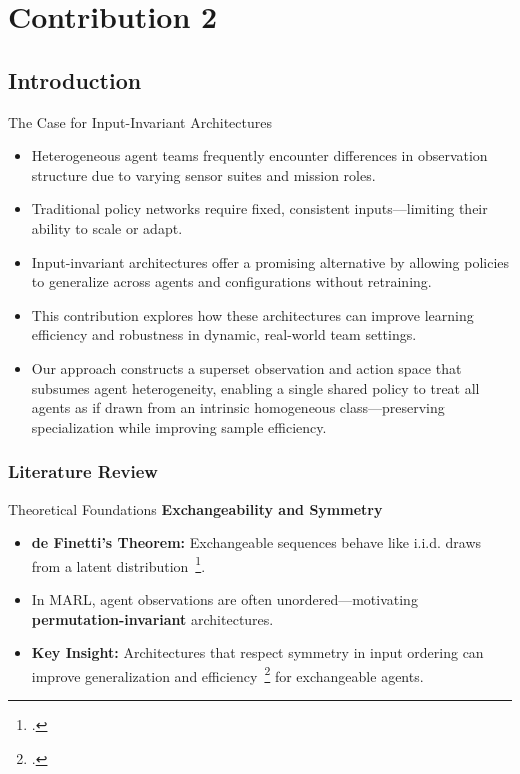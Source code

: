\section{Contribution 2}


\subsection{Introduction}

\begin{frame}{The Case for Input-Invariant Architectures}
    \begin{itemize}
        \item Heterogeneous agent teams frequently encounter differences in observation 
            structure due to varying sensor suites and mission roles.
        \item Traditional policy networks require fixed, consistent inputs—limiting their 
            ability to scale or adapt.
        \item Input-invariant architectures offer a promising alternative by allowing 
            policies to generalize across agents and configurations without retraining.
        \item This contribution explores how these architectures can improve learning 
            efficiency and robustness in dynamic, real-world team settings.
        \item Our approach constructs a superset observation and action space that subsumes agent heterogeneity, enabling a single shared policy to treat all agents as if drawn from an intrinsic homogeneous class—preserving specialization while improving sample efficiency.
    \end{itemize}
\end{frame}


\subsubsection{Literature Review}


\begin{frame}{Theoretical Foundations}
    \textbf{Exchangeability and Symmetry}
    \begin{itemize}
        \item \textbf{de Finetti's Theorem:} Exchangeable sequences behave like i.i.d. 
            draws from a latent distribution~\footcite{alvarez-melis2015}.
        \item In MARL, agent observations are often unordered—motivating 
            \textbf{permutation-invariant} architectures.
        \item \textbf{Key Insight:} Architectures that respect symmetry in input 
            ordering can improve generalization and efficiency~\footcite{hartford2018}
            for exchangeable agents.
    \end{itemize}
\end{frame}

